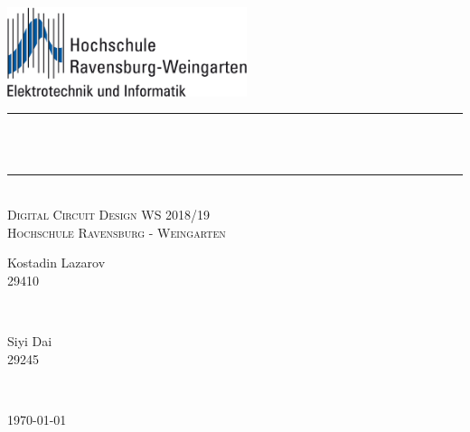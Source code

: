 \begin{titlepage}

\newcommand{\HRule}{\rule{\linewidth}{0.3mm}} %


\includegraphics[width=7cm]{title/logo.png}\\[3cm] %
 

\center %



\makeatletter
\HRule \\[0.8cm]
{ \huge \bfseries \@title}\\[0.4cm] %
\HRule \\[0.5cm]


\textsc{\Large Digital Circuit Design WS 2018/19}\\[0.3cm] 
\textsc{\large Hochschule Ravensburg - Weingarten}\\ [1.5cm]



\begin{minipage}{0.4\textwidth}
\begin{flushleft} \large
Kostadin Lazarov \\
29410 \\
\end{flushleft}
\end{minipage}
~
\begin{minipage}{0.4\textwidth}
\begin{flushright} \large
Siyi Dai \\
29245 \\
\end{flushright}
\end{minipage}\\[2cm]
\makeatother


{\large \today}\\[7cm] 

\vfill %

\end{titlepage}